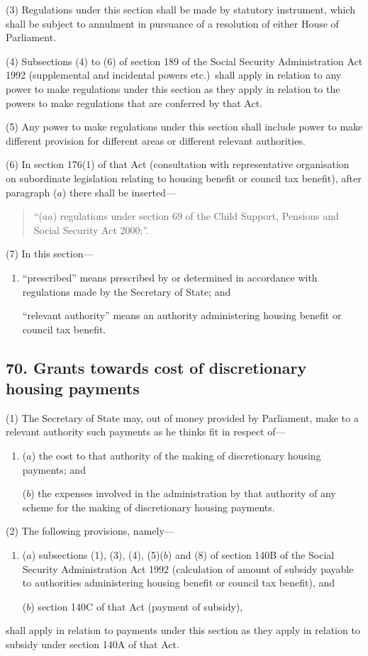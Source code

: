 \documentclass[12pt,a4paper]{article}
\begin{document}
(3) Regulations under this section shall be made by statutory instrument, which shall be subject to annulment in pursuance of a resolution of either House of Parliament.

(4) Subsections (4)  to (6)  of section 189 of the Social Security Administration Act 1992 (supplemental and incidental powers etc.)\ shall apply in relation to any power to make regulations under this section as they apply in relation to the powers to make regulations that are conferred by that Act.

(5) Any power to make regulations under this section shall include power to make different provision for different areas or different relevant authorities.

(6) In section 176(1)  of that Act (consultation with representative organisation on subordinate legislation relating to housing benefit or council tax benefit), after paragraph ($a$)  there shall be inserted—
\begin{quotation}
“($aa$) regulations under section 69 of the Child Support, Pensions and Social Security Act 2000;”.
\end{quotation}

(7) In this section—
\begin{enumerate}\item[]
    “prescribed” means prescribed by or determined in accordance with regulations made by the Secretary of State; and

    “relevant authority” means an authority administering housing benefit or council tax benefit. 
\end{enumerate}

\subsection{70. Grants towards cost of discretionary housing payments}

(1) The Secretary of State may, out of money provided by Parliament, make to a relevant authority such payments as he thinks fit in respect of—
\begin{enumerate}\item[]
($a$) the cost to that authority of the making of discretionary housing payments; and

($b$) the expenses involved in the administration by that authority of any scheme for the making of discretionary housing payments.
\end{enumerate}

(2) The following provisions, namely—
\begin{enumerate}\item[]
($a$) subsections (1), (3), (4), (5)($b$)
and (8)  of section 140B of the Social Security Administration Act 1992 (calculation of amount of subsidy payable to authorities administering housing benefit or council tax benefit), and

($b$) section 140C of that Act (payment of subsidy),
\end{enumerate}
shall apply in relation to payments under this section as they apply in relation to subsidy under section 140A of that Act.
\end{document}
